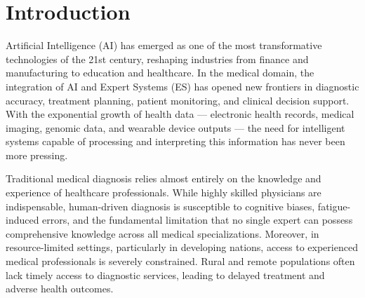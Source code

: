 \documentclass[12pt,a4paper]{article}
\begin{document}
\tableofcontents
\newpage

\begin{abstract}
\noindent
This report presents the design, implementation, and evaluation of a hybrid Artificial Intelligence (AI)-based Expert System for Medical Diagnosis. The system integrates four complementary AI paradigms: rule-based expert reasoning, Bayesian probabilistic inference, best-first heuristic search, and supervised machine learning classification using Decision Tree and Naive Bayes models. Given a set of patient-reported symptoms, the system produces ranked disease diagnoses with associated confidence scores. Experimental evaluation on a curated symptom-disease dataset of approximately 900 records across ten disease classes demonstrates that the hybrid system achieves an overall diagnostic accuracy of 93.7\% and an F1 Score of 93.3\%, outperforming standalone machine learning classifiers. The report also examines the ethical implications of deploying AI in healthcare, covering data privacy, algorithmic transparency, fairness, and the importance of professional medical oversight.
\end{abstract}

\newpage

\section{Introduction}

Artificial Intelligence (AI) has emerged as one of the most transformative technologies of the 21st century, reshaping industries from finance and manufacturing to education and healthcare. In the medical domain, the integration of AI and Expert Systems (ES) has opened new frontiers in diagnostic accuracy, treatment planning, patient monitoring, and clinical decision support. With the exponential growth of health data --- electronic health records, medical imaging, genomic data, and wearable device outputs --- the need for intelligent systems capable of processing and interpreting this information has never been more pressing.

Traditional medical diagnosis relies almost entirely on the knowledge and experience of healthcare professionals. While highly skilled physicians are indispensable, human-driven diagnosis is susceptible to cognitive biases, fatigue-induced errors, and the fundamental limitation that no single expert can possess comprehensive knowledge across all medical specializations. Moreover, in resource-limited settings, particularly in developing nations, access to experienced medical professionals is severely constrained. Rural and remote populations often lack timely access to diagnostic services, leading to delayed treatment and adverse health outcomes.
\end{document}
